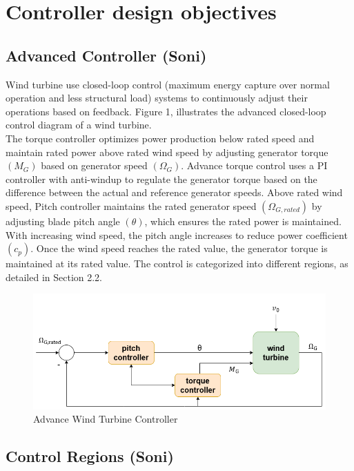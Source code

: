 \chapter{Controller design objectives}
\section{Advanced Controller (Soni)}

Wind turbine use closed-loop control (maximum energy capture over normal operation and less structural load) systems to continuously adjust their operations based on feedback. Figure 1, illustrates the advanced closed-loop control diagram of a wind turbine. 
\\[16pt]
The torque controller optimizes power production below rated speed and maintain rated power above rated wind speed by adjusting generator torque $(M_G)$ based on generator speed $(\Omega_G)$. Advance torque control uses a PI controller with anti-windup to regulate the generator torque based on the difference between the actual and reference generator speeds. Above rated wind speed, Pitch controller maintains the rated generator speed $(\Omega_{G,rated})$ by adjusting blade pitch angle $(\theta)$, which ensures the rated power is maintained. With increasing wind speed, the pitch angle increases to reduce power coefficient $(c_p)$. Once the wind speed reaches the rated value, the generator torque is maintained at its rated value. The control is categorized into different regions, as detailed in Section 2.2.

\begin{figure}[htbp]
	\centering
	\includegraphics[width=\textwidth]{Figures/Figure_1.png}
	\caption{Advance Wind Turbine Controller}
\end{figure}
 

\section{Control Regions (Soni)} \label{control regions}


